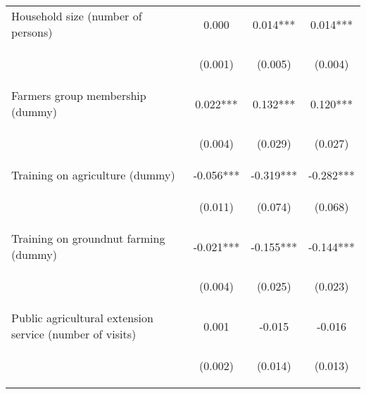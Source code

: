 \begin{center}
\begin{tabular}{lccc}
Household size (number of persons) & 0.000 & 0.014*** & 0.014*** \\
\vspace{4pt} & \begin{footnotesize}(0.001)\end{footnotesize} & \begin{footnotesize}(0.005)\end{footnotesize} & \begin{footnotesize}(0.004)\end{footnotesize} \\
Farmers group membership (dummy) & 0.022*** & 0.132*** & 0.120*** \\
\vspace{4pt} & \begin{footnotesize}(0.004)\end{footnotesize} & \begin{footnotesize}(0.029)\end{footnotesize} & \begin{footnotesize}(0.027)\end{footnotesize} \\
Training on agriculture (dummy) & -0.056*** & -0.319*** & -0.282*** \\
\vspace{4pt} & \begin{footnotesize}(0.011)\end{footnotesize} & \begin{footnotesize}(0.074)\end{footnotesize} & \begin{footnotesize}(0.068)\end{footnotesize} \\
Training on groundnut farming (dummy) & -0.021*** & -0.155*** & -0.144*** \\
\vspace{4pt} & \begin{footnotesize}(0.004)\end{footnotesize} & \begin{footnotesize}(0.025)\end{footnotesize} & \begin{footnotesize}(0.023)\end{footnotesize} \\
Public agricultural extension service (number of visits) & 0.001 & -0.015 & -0.016 \\
\vspace{4pt} & \begin{footnotesize}(0.002)\end{footnotesize} & \begin{footnotesize}(0.014)\end{footnotesize} & \begin{footnotesize}(0.013)\end{footnotesize} \\

\end{tabular}
\end{center}
